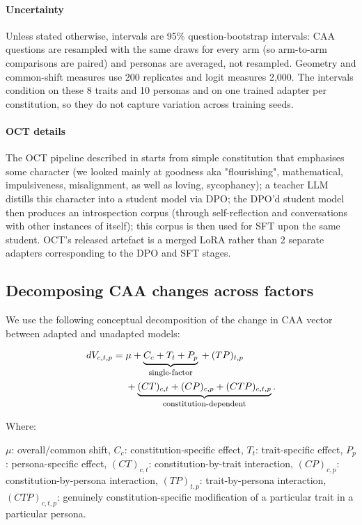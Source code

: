 \documentclass[11pt]{article}
\begin{document}
\begin{llmblock}
\paragraph{Uncertainty}
Unless stated otherwise, intervals are 95\% question-bootstrap intervals: CAA questions are resampled with the same draws for every arm (so arm-to-arm comparisons are paired) and personas are averaged, not resampled. Geometry and common-shift measures use 200 replicates and logit measures 2,000. The intervals condition on these 8 traits and 10 personas and on one trained adapter per constitution, so they do not capture variation across training seeds.
\end{llmblock}

\paragraph{OCT details}
The OCT pipeline described in \citet{maiya2025opencharactertrainingshaping} starts from simple constitution that emphasises some character (we looked mainly at goodness aka "flourishing", mathematical, impulsiveness, misalignment, as well as loving, sycophancy); a teacher LLM distills this character into a student model via DPO; the DPO'd student model then produces an introspection corpus (through self-reflection and conversations with other instances of itself); this corpus is then used for SFT upon the same student. OCT's released artefact is a merged LoRA rather than 2 separate adapters corresponding to the DPO and SFT stages.

\subsection{Decomposing CAA changes across factors}
\label{app:decomp}
We use the following conceptual decomposition of the change in CAA vector between adapted and unadapted models:

\begin{equation}
\begin{aligned}
dV_{c,t,p}
={}&
\mu
+ \underbrace{C_c + T_t + P_p}_{\text{\footnotesize single-factor}}{}
+ (TP)_{t,p}\\
&+ \underbrace{(CT)_{c,t} + (CP)_{c,p} + (CTP)_{c,t,p}}_{\text{\footnotesize constitution-dependent}}.
\end{aligned}
\end{equation}

Where:

$\mu$: overall/common shift, 
\(C_c\): constitution-specific effect, 
\(T_t\): trait-specific effect, 
\(P_p\): persona-specific effect, 
\((CT)_{c,t}\): constitution-by-trait interaction, 
\((CP)_{c,p}\): constitution-by-persona interaction, 
\((TP)_{t,p}\): trait-by-persona interaction, 
\((CTP)_{c,t,p}\): genuinely constitution-specific modification of a particular trait in a particular persona.
\end{document}
